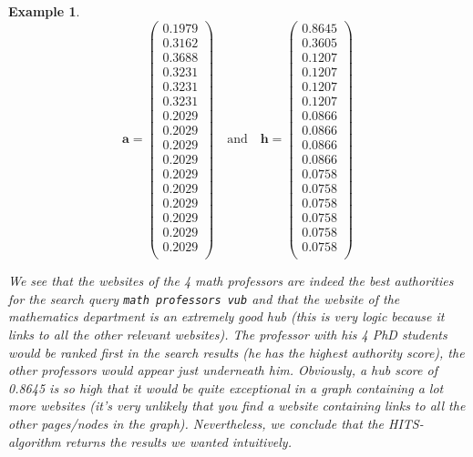 \documentclass[a4paper,11pt]{report}
\newtheorem{example}[theorem]{Example}
\begin{document}
\begin{example}
$$ \mathbf{a} = \begin{pmatrix}
0.1979\\
0.3162\\
\mathbf{0.3688}\\
0.3231\\
0.3231\\
0.3231\\
0.2029\\
0.2029\\
0.2029\\
0.2029\\
0.2029\\
0.2029\\
0.2029\\
0.2029\\
0.2029\\
0.2029\\
\end{pmatrix} \quad \text{and} \quad
\mathbf{h} = \begin{pmatrix}
\mathbf{0.8645}\\
0.3605\\
0.1207\\
0.1207\\
0.1207\\
0.1207\\
0.0866\\
0.0866\\
0.0866\\
0.0866\\
0.0758\\
0.0758\\
0.0758\\
0.0758\\
0.0758\\
0.0758\\
\end{pmatrix}
$$

We see that the websites of the 4 math professors are indeed the best authorities for the search 
query \texttt{math professors vub} and that the website of the mathematics department is an 
extremely good hub (this is very logic because it links to all the other relevant 
websites). The professor with his 4 PhD students would be ranked first in the 
search results (he has the highest authority score), the other professors would 
appear just underneath him. Obviously, a hub score of 0.8645 is so high that it would be quite exceptional in 
a graph containing a lot more websites (it's very unlikely that you find a website containing links to all the other pages/nodes in the graph). Nevertheless, we conclude that the HITS-algorithm returns the 
results we wanted intuitively.

\end{example}
\end{document}
